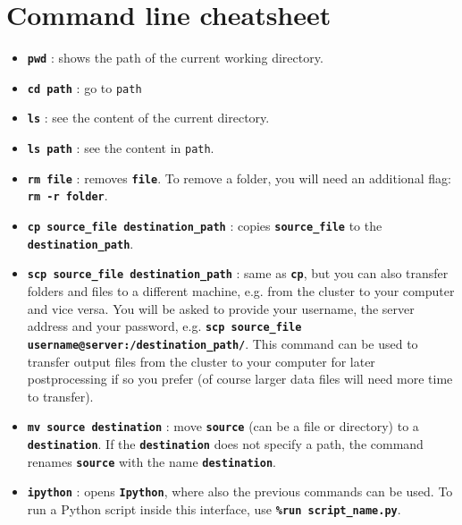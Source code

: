 \documentclass{article}
\newcommand{\commandline}[1]{\texttt{\textbf{#1}}}
\begin{document}
\section{Command line cheatsheet}

\begin{itemize}

\item{\commandline{pwd}} : shows the path of the current working directory.

\item \commandline{cd path} :  go to \texttt{path}

\item \commandline{ls} :  see the content of the current directory. 

\item \commandline{ls path} :  see the content in \texttt{path}.

\item \commandline{rm file} : removes \commandline{file}. To remove a folder, you will need an additional flag: \commandline{rm -r folder}.

\item \commandline{cp source\_file destination\_path} :  copies  \commandline{source\_file} to the \commandline{destination\_path}.

\item \commandline{scp source\_file destination\_path} :  same as \commandline{cp}, but you can also transfer folders and files to a different machine, e.g. from the cluster to your computer and vice versa. You will be asked to provide your username, the server address and your password, e.g. \commandline{scp source\_file username@server:/destination\_path/}. This command can be used to transfer output files from the cluster to your computer for later postprocessing if so you prefer (of course larger data files will need more time to transfer).

\item \commandline{mv source destination} : move \commandline{source} (can be a file or directory) to a \commandline{destination}. If the \commandline{destination} does not specify a path, the command renames \commandline{source} with the name \commandline{destination}.

\item \commandline{ipython} : opens \commandline{Ipython}, where also the previous commands can be used. To run a Python script inside this interface, use \commandline{\%run script\_name.py}.





\end{itemize}


 
\end{document}
